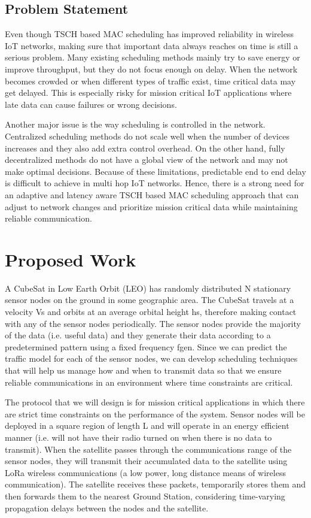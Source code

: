 \documentclass[a4paper,fleqn]{cas-dc}
\numberwithin{equation}{section}
\begin{document}
\subsection{Problem Statement}
 Even though TSCH based MAC scheduling has improved reliability in wireless IoT networks, making sure that important data always reaches on time is still a serious problem. Many existing scheduling methods mainly try to save energy or improve throughput, but they do not focus enough on delay. When the network becomes crowded or when different types of traffic exist, time critical data may get delayed. This is especially risky for mission critical IoT applications where late data can cause failures or wrong decisions.

Another major issue is the way scheduling is controlled in the network. Centralized scheduling methods do not scale well when the number of devices increases and they also add extra control overhead. On the other hand, fully decentralized methods do not have a global view of the network and may not make optimal decisions. Because of these limitations, predictable end to end delay is difficult to achieve in multi hop IoT networks. Hence, there is a strong need for an adaptive and latency aware TSCH based MAC scheduling approach that can adjust to network changes and prioritize mission critical data while maintaining reliable communication.

\section{Proposed Work}
A CubeSat in Low Earth Orbit (LEO) has randomly distributed N stationary sensor nodes on the ground in some geographic area. The CubeSat travels at a velocity Vs and orbits at an average orbital height hs, therefore making contact with any of the sensor nodes periodically. The sensor nodes provide the majority of the data (i.e. useful data) and they generate their data according to a predetermined pattern using a fixed frequency fgen. Since we can predict the traffic model for each of the sensor nodes, we can develop scheduling techniques that will help us manage how and when to transmit data so that we ensure reliable communications in an environment where time constraints are critical.

The protocol that we will design is for mission critical applications in which there are strict time constraints on the performance of the system. Sensor nodes will be deployed in a square region of length L and will operate in an energy efficient manner (i.e. will not have their radio turned on when there is no data to transmit). When the satellite passes through the communications range of the sensor nodes, they will transmit their accumulated data to the satellite using LoRa wireless communications (a low power, long distance means of wireless communication). The satellite receives these packets, temporarily stores them and then forwards them to the nearest Ground Station, considering time-varying propagation delays between the nodes and the satellite.
\end{document}
